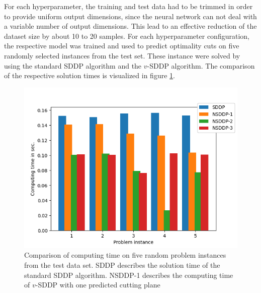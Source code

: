 For each hyperparameter, the training and test data had to be trimmed in order to provide uniform output dimensions, since the neural network can not deal with a variable number of output dimensions.
This lead to an effective reduction of the dataset size by about 10 to 20 samples. 
For each hyperparameter configuration, the respective model was trained and used to predict optimality cuts on five randomly selected instances from the test set.
These instance were solved by using the standard SDDP algorithm and the $v$-SDDP algorithm.
The comparison of the respective solution times is visualized in figure \ref{fig:Solution Comparison}.
\begin{figure}[h]
    \centering
    \includegraphics[width=\linewidth]{Computing_comparison_128hidden_neurons.png}
    \caption{Comparison of computing time on five random problem instances from the test data set. SDDP describes the solution time of the standard SDDP algorithm. NSDDP-1 describes the computing time of $v$-SDDP with one predicted cutting plane}
    \label{fig:Solution Comparison}
\end{figure}

